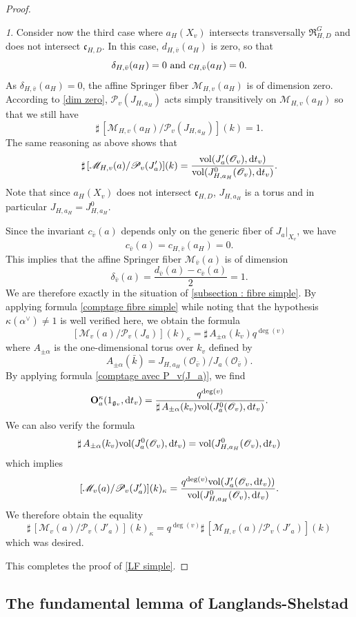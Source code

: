 \documentclass[12pt,english]{smfart}
\numberwithin{equation}{subsection}
\theoremstyle{remark}
\newtheorem{numero}[equation]{}
\newcommand\calP{{\mathscr P}}
\newcommand\calM{{\mathscr M}}
\newcommand\calO{{\mathscr O}}
\newcommand\frakg{{\mathfrak g}}
\newcommand\frakc{{\mathfrak c}}
\newcommand\resultant{\mathfrak R}
\begin{document}
\begin{proof}
\begin{numero}
Consider now the third case where $a_H(X_v)$ intersects
transversally $\resultant_{H,D}^G$ and does not intersect $\frakc_{H,D}$.
In this case, $d_{H,\bar v}(a_H)$ is zero, so that
$$\delta_{H,\bar v}(a_H)=0\ {\rm and}\ c_{H,\bar v}(a_H)=0.$$
As $\delta_{H,\bar v}(a_H)=0$, the affine Springer fiber
$\calM_{H,v}(a_H)$ is of dimension zero. According to \ref{dim zero},
$\calP_v(J_{H,a_H})$ acts simply transitively on
$\calM_{H,v}(a_H)$ so that we still have
$$\sharp\, [\calM_{H,v}(a_H)/\calP_v(J_{H,a_H})](k)=1.$$
The same reasoning as above shows that
$$\sharp\,[\calM_{H,v}(a)/\calP_v(J'_a)](k)=\frac{{\rm vol} (J'_a(\calO_v),{\rm
d}t_v) }{ {\rm vol}(J^0_{H,a_H}(\calO_v),{\rm d}t_v)}.
$$
Note that since $a_H(X_v)$ does not intersect $\frakc_{H,D}$,
$J_{H,a_H}$ is a torus and in particular $J_{H,a_H}=J_{H,a_H}^0$.

Since the invariant $c_{\bar v}(a)$ depends only on the generic fiber
of $J_a|_{X_v}$, we have
$$c_{\bar v}(a)=c_{H,\bar v}(a_H)=0.$$
This implies that the affine Springer fiber $\calM_{\bar v}(a)$ is of
dimension
$$\delta_{\bar v}(a)=\frac{d_{\bar v}(a)-c_{\bar v}(a) }{ 2}=1.$$
We are therefore exactly in the situation of \ref{subsection : fibre simple}.
By applying formula \ref{comptage fibre simple} while noting that
the hypothesis $\kappa(\alpha^\vee)\not=1$ is well verified here, we
obtain the formula
$$[\calM_v(a)/\calP_v(J_a)](k)_\kappa= \sharp\, A_{\pm\alpha}(k_v) q^{\deg(v)}$$
where $A_{\pm \alpha}$ is the one-dimensional torus over $k_v$ defined by
$$A_{\pm \alpha}(\bar k)=J_{H,a_H}(\calO_{\bar v})/ J_a(\calO_{\bar v}).$$
By applying formula \ref{comptage avec P_v(J_a)}, we find
$${\bf O}_{a}^\kappa(1_{\frakg_v},{\rm d}t_v)= \frac{q^{\deg(v)}
}{ \sharp\, A_{\pm\alpha}(k_v) {\rm vol}(J^0_{a}(\calO_v),{\rm d}t_v)}.
$$
We can also verify the formula
$$\sharp\, A_{\pm\alpha}(k_v){\rm vol}(J^0_{a}(\calO_v),{\rm d}t_v)=
{\rm vol}(J^0_{H,a_H}(\calO_v),{\rm d}t_v)$$ which implies
$$[\calM_v(a)/\calP_v(J'_a)](k)_\kappa= \frac{ q^{\deg(v)} {\rm vol}(J'_a(\calO_v, {\rm d}t_v))
}{ {\rm vol}(J^0_{H,a_H}(\calO_v),{\rm d}t_v)}.
$$
We therefore obtain the equality
$$\sharp\,[\calM_v(a)/\calP_v(J'_a)](k)_\kappa=
q^{\deg(v)}\sharp\,[\calM_{H,v}(a)/\calP_v(J'_a)](k)
$$
which was desired.
\end{numero}

This completes the proof of \ref{LF simple}.
\end{proof}


\subsection{The fundamental lemma of Langlands-Shelstad}
\label{lemme fondamental}
\end{document}
